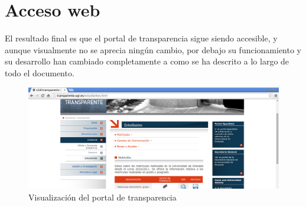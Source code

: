 \newpage
\section{Acceso web}

El resultado final es que el portal de transparencia sigue siendo accesible, y aunque visualmente no se aprecia ningún cambio, por debajo su funcionamiento y su desarrollo han cambiado completamente a como se ha descrito a lo largo de todo el documento.

\begin{figure}[!ht]
	\begin{center}
		\includegraphics[width=1\textwidth]{../images/transparente.png}
		\caption{Visualización del portal de transparencia}
		\label{fig:transparente}
	\end{center}
\end{figure}